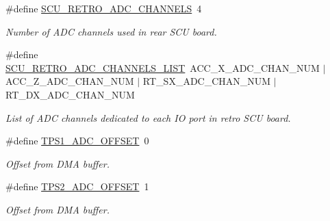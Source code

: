 \begin{DoxyCompactItemize}
\#define \mbox{\hyperlink{group___board__model__group_gadedc78ae5ed236e74a4e12c031209d29}{S\+C\+U\+\_\+\+R\+E\+T\+R\+O\+\_\+\+A\+D\+C\+\_\+\+C\+H\+A\+N\+N\+E\+LS}}~4
\begin{DoxyCompactList}\small\item\em Number of A\+DC channels used in rear S\+CU board. \end{DoxyCompactList}\item 
\mbox{\label{group___board__model__group_ga5190c5da456959fb6c7132518a51f12f}} 
\#define \mbox{\hyperlink{group___board__model__group_ga5190c5da456959fb6c7132518a51f12f}{S\+C\+U\+\_\+\+R\+E\+T\+R\+O\+\_\+\+A\+D\+C\+\_\+\+C\+H\+A\+N\+N\+E\+L\+S\+\_\+\+L\+I\+ST}}~A\+C\+C\+\_\+\+X\+\_\+\+A\+D\+C\+\_\+\+C\+H\+A\+N\+\_\+\+N\+UM $\vert$ A\+C\+C\+\_\+\+Z\+\_\+\+A\+D\+C\+\_\+\+C\+H\+A\+N\+\_\+\+N\+UM $\vert$ R\+T\+\_\+\+S\+X\+\_\+\+A\+D\+C\+\_\+\+C\+H\+A\+N\+\_\+\+N\+UM $\vert$ R\+T\+\_\+\+D\+X\+\_\+\+A\+D\+C\+\_\+\+C\+H\+A\+N\+\_\+\+N\+UM
\begin{DoxyCompactList}\small\item\em List of A\+DC channels dedicated to each IO port in retro S\+CU board. \end{DoxyCompactList}\item 
\mbox{\label{group___board__model__group_ga7ce02d79fba23321a377a26a963e2bdf}} 
\#define \mbox{\hyperlink{group___board__model__group_ga7ce02d79fba23321a377a26a963e2bdf}{T\+P\+S1\+\_\+\+A\+D\+C\+\_\+\+O\+F\+F\+S\+ET}}~0
\begin{DoxyCompactList}\small\item\em Offset from D\+MA buffer. \end{DoxyCompactList}\item 
\mbox{\label{group___board__model__group_ga24019e59e805c7acf8f816e141d3d689}} 
\#define \mbox{\hyperlink{group___board__model__group_ga24019e59e805c7acf8f816e141d3d689}{T\+P\+S2\+\_\+\+A\+D\+C\+\_\+\+O\+F\+F\+S\+ET}}~1
\begin{DoxyCompactList}\small\item\em Offset from D\+MA buffer. \end{DoxyCompactList}\item 
\mbox{\label{group___board__model__group_gade98eccd60c9b68cde78ca4c0009a84c}} 

\end{DoxyCompactItemize}
